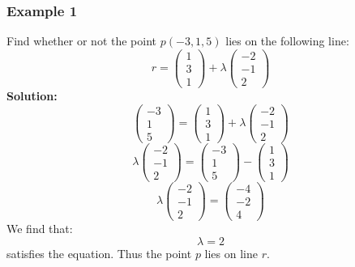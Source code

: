 \documentclass[hidelinks, a4paper, 12pt]{article}
\newcommand{\bd}{\textbf}
\begin{document}
            \subsubsection{Example 1}
                Find whether or not the point $p(-3, 1, 5)$ lies on the following line:
                \[r = \begin{pmatrix} 1 \\ 3 \\ 1 \end{pmatrix} + \lambda \begin{pmatrix} -2 \\ -1 \\ 2 \end{pmatrix}\]
                \bd{Solution:}
                \[\begin{pmatrix} -3 \\ 1 \\ 5 \end{pmatrix} = \begin{pmatrix} 1 \\ 3 \\ 1 \end{pmatrix} + \lambda \begin{pmatrix} -2 \\ -1 \\ 2 \end{pmatrix}\]
                \[\lambda \begin{pmatrix} -2 \\ -1 \\ 2 \end{pmatrix} = \begin{pmatrix} -3 \\ 1 \\ 5 \end{pmatrix} - \begin{pmatrix} 1 \\ 3 \\ 1 \end{pmatrix}\]
                \[\lambda \begin{pmatrix} -2 \\ -1 \\ 2 \end{pmatrix} = \begin{pmatrix} -4 \\ -2 \\ 4 \end{pmatrix}\]
                We find that:
                \[\lambda = 2\]
                satisfies the equation. Thus the point $p$ lies on line $r$.
\end{document}
